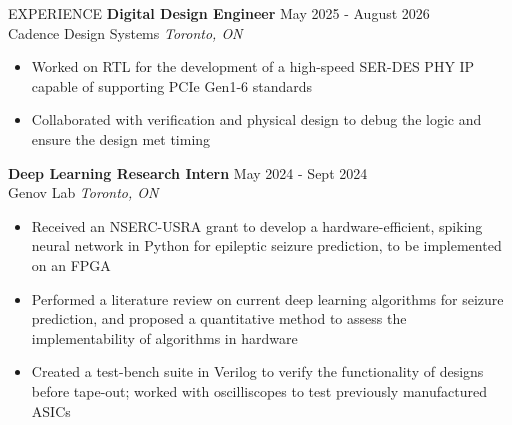 \documentclass{resume}
\begin{document}
\begin{rSection}{EXPERIENCE}
    \textbf{Digital Design Engineer} \hfill May 2025 - August 2026\\
   Cadence Design Systems \hfill \textit{Toronto, ON}
   \vspace{-0.2cm}
    \begin{itemize}
       \itemsep -8pt {} 
       \item Worked on RTL for the development of a high-speed SER-DES PHY IP capable of supporting PCIe Gen1-6 standards
       \item Collaborated with verification and physical design to debug the logic and ensure the design met timing
    \end{itemize}
   \textbf{Deep Learning Research Intern} \hfill May 2024 - Sept 2024\\
   Genov Lab \hfill \textit{Toronto, ON}
   \vspace{-0.2cm}
    \begin{itemize}
       \itemsep -8pt {} 
       \item Received an NSERC-USRA grant to develop a hardware-efficient, spiking neural network in Python for epileptic seizure prediction, to be implemented on an FPGA
       \item Performed a literature review on current deep learning algorithms for seizure prediction, and proposed a quantitative method to assess the implementability of algorithms in hardware
       \item Created a test-bench suite in Verilog to verify the functionality of designs before tape-out; worked with oscilliscopes to test previously manufactured ASICs 
   
    \end{itemize}


\end{rSection}
\end{document}

